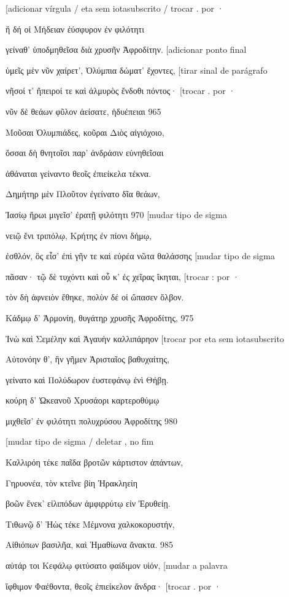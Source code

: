 {[}adicionar vírgula / eta sem iotasubscrito / trocar . por ·

ἣ δή οἱ Μήδειαν ἐύσφυρον ἐν φιλότητι

γείναθ' ὑποδμηθεῖσα διὰ χρυσῆν Ἀφροδίτην. {[}adicionar ponto final

ὑμεῖς μὲν νῦν χαίρετ', Ὀλύμπια δώματ' ἔχοντες, {[}tirar sinal de
parágrafo

νῆσοί τ' ἤπειροί τε καὶ ἁλμυρὸς ἔνδοθι πόντος· {[}trocar . por ·

νῦν δὲ θεάων φῦλον ἀείσατε, ἡδυέπειαι 965

Μοῦσαι Ὀλυμπιάδες, κοῦραι Διὸς αἰγιόχοιο,

ὅσσαι δὴ θνητοῖσι παρ' ἀνδράσιν εὐνηθεῖσαι

ἀθάναται γείναντο θεοῖς ἐπιείκελα τέκνα.

Δημήτηρ μὲν Πλοῦτον ἐγείνατο δῖα θεάων,

Ἰασίῳ ἥρωι μιγεῖσ' ἐρατῇ φιλότητι 970 {[}mudar tipo de sigma

νειῷ ἔνι τριπόλῳ, Κρήτης ἐν πίονι δήμῳ,

ἐσθλόν, ὃς εἶσ' ἐπὶ γῆν τε καὶ εὐρέα νῶτα θαλάσσης {[}mudar tipo de
sigma

πᾶσαν· τῷ δὲ τυχόντι καὶ οὗ κ' ἐς χεῖρας ἵκηται, {[}trocar : por ·

τὸν δὴ ἀφνειὸν ἔθηκε, πολὺν δέ οἱ ὤπασεν ὄλβον.

Κάδμῳ δ' Ἁρμονίη, θυγάτηρ χρυσῆς Ἀφροδίτης, 975

Ἰνὼ καὶ Σεμέλην καὶ Ἀγαυὴν καλλιπάρηον {[}trocar por eta sem
iotasubscrito

Αὐτονόην θ', ἣν γῆμεν Ἀρισταῖος βαθυχαίτης,

γείνατο καὶ Πολύδωρον ἐυστεφάνῳ ἐνὶ Θήβῃ.

κούρη δ' Ὠκεανοῦ Χρυσάορι καρτεροθύμῳ

μιχθεῖσ' ἐν φιλότητι πολυχρύσου Ἀφροδίτης 980

{[}mudar tipo de sigma / deletar , no fim

Καλλιρόη τέκε παῖδα βροτῶν κάρτιστον ἁπάντων,

Γηρυονέα, τὸν κτεῖνε βίη Ἡρακληείη

βοῶν ἕνεκ' εἰλιπόδων ἀμφιρρύτῳ εἰν Ἐρυθείῃ.

Τιθωνῷ δ' Ἠὼς τέκε Μέμνονα χαλκοκορυστήν,

Αἰθιόπων βασιλῆα, καὶ Ἠμαθίωνα ἄνακτα. 985

αὐτάρ τοι Κεφάλῳ φιτύσατο φαίδιμον υἱόν, {[}mudar a palavra

ἴφθιμον Φαέθοντα, θεοῖς ἐπιείκελον ἄνδρα· {[}trocar . por ·

